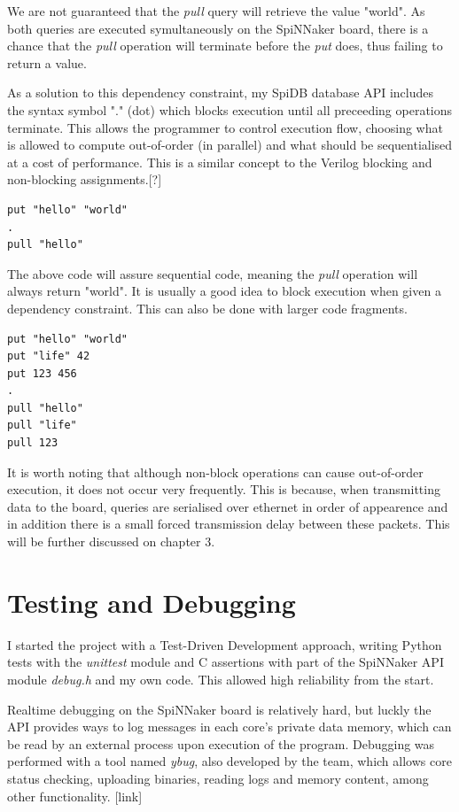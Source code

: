 We are not guaranteed that the \textit{pull} query will retrieve the value "world". As both queries are executed symultaneously on the SpiNNaker board, there is a chance that the \textit{pull} operation will terminate before the \textit{put} does, thus failing to return a value.

As a solution to this dependency constraint, my SpiDB database API includes the syntax symbol "." (dot) which blocks execution until all preceeding operations terminate. This allows the programmer to control execution flow, choosing what is allowed to compute out-of-order (in parallel) and what should be sequentialised at a cost of performance. This is a similar concept to the Verilog blocking and non-blocking assignments.[?]

\begin{lstlisting}[caption={Blocking execution}, label=list:blocking1]
put "hello" "world"
.
pull "hello"
\end{lstlisting}

The above code will assure sequential code, meaning the \textit{pull} operation will always return "world". It is usually a good idea to block execution when given a dependency constraint. This can also be done with larger code fragments.

\begin{lstlisting}[caption={Blocking execution}, label=list:blocking2]
put "hello" "world"
put "life" 42
put 123 456
.
pull "hello"
pull "life"
pull 123
\end{lstlisting}

It is worth noting that although non-block operations can cause out-of-order execution, it does not occur very frequently. This is because, when transmitting data to the board, queries are serialised over ethernet in order of appearence and in addition there is a small forced transmission delay between these packets. This will be further discussed on chapter 3.%

\section{Testing and Debugging}
I started the project with a Test-Driven Development approach, writing Python tests with the \textit{unittest} module and C assertions with part of the SpiNNaker API module \textit{debug.h} and my own code. This allowed high reliability from the start.

Realtime debugging on the SpiNNaker board is relatively hard, but luckly the API provides ways to log messages in each core's private data memory, which can be read by an external process upon execution of the program. Debugging was performed with a tool named \textit{ybug}, also developed by the team, which allows core status checking, uploading binaries, reading logs and memory content, among other functionality.\cite{ybug} [link]

